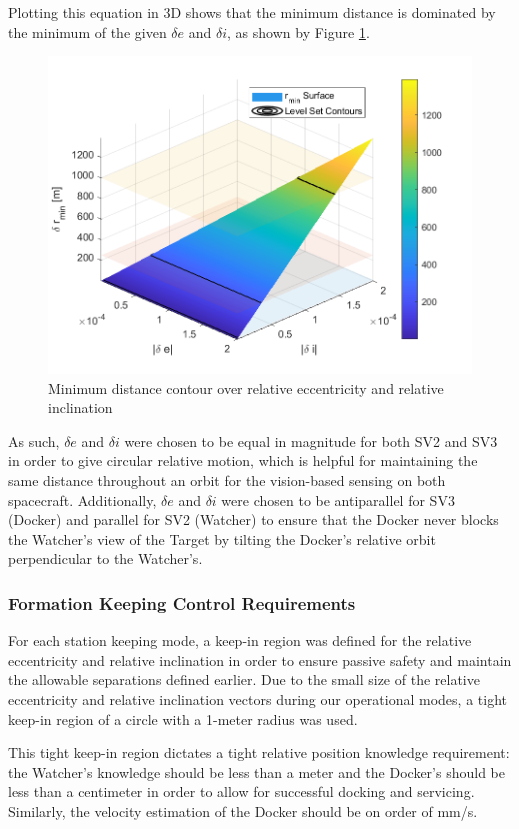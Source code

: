 Plotting this equation in 3D shows that the minimum distance is dominated by the minimum of the given $\delta e$ and $\delta i$, as shown by Figure \ref{fig:min_dist_contour}.
\begin{figure}[H]
    \centering
    \includegraphics[width=0.75\linewidth]{sim/figures/PS5/min_dist_contour.png}
    \caption{Minimum distance contour over relative eccentricity and relative inclination}
    \label{fig:min_dist_contour}
\end{figure}
As such, $\delta e$ and $\delta i$ were chosen to be equal in magnitude for both SV2 and SV3 in order to give circular relative motion, which is helpful for maintaining the same distance throughout an orbit for the vision-based sensing on both spacecraft. Additionally, $\delta e$ and $\delta i$ were chosen to be antiparallel for SV3 (Docker) and parallel for SV2 (Watcher) to ensure that the Docker never blocks the Watcher's view of the Target by tilting the Docker's relative orbit perpendicular to the Watcher's.

\subsubsection{Formation Keeping Control Requirements}
For each station keeping mode, a keep-in region was defined for the relative eccentricity and relative inclination in order to ensure passive safety and maintain the allowable separations defined earlier. Due to the small size of the relative eccentricity and relative inclination vectors during our operational modes, a tight keep-in region of a circle with a 1-meter radius was used. 

This tight keep-in region dictates a tight relative position knowledge requirement: the Watcher's knowledge should be less than a meter and the Docker's should be less than a centimeter in order to allow for successful docking and servicing. Similarly, the velocity estimation of the Docker should be on order of mm/s.

